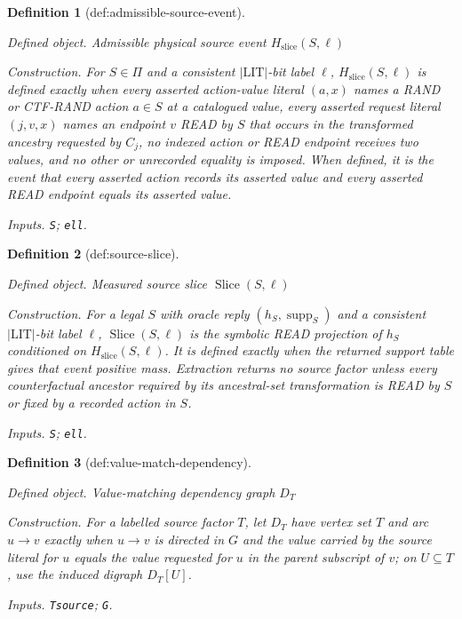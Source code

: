 \documentclass{article}
\newtheorem{definition}{Definition}
\begin{document}
\begin{definition}[def:admissible-source-event]\label{def:admissible-source-event}
\par\smallskip\noindent\emph{Defined object.} Admissible physical source event \(H_{\mathrm{slice}}(S,\ell)\)
\par\smallskip\noindent\emph{Construction.} For \(S\in\Pi\) and a consistent \(|\mathrm{LIT}|\)-bit label \(\ell\), \(H_{\mathrm{slice}}(S,\ell)\) is defined exactly when every asserted action-value literal \((a,x)\) names a RAND or CTF-RAND action \(a\in S\) at a catalogued value, every asserted request literal \((j,v,x)\) names an endpoint \(v\) READ by \(S\) that occurs in the transformed ancestry requested by \(C_j\), no indexed action or READ endpoint receives two values, and no other or unrecorded equality is imposed. When defined, it is the event that every asserted action records its asserted value and every asserted READ endpoint equals its asserted value.
\par\smallskip\noindent\emph{Inputs.} \texttt{S}; \texttt{ell}.
\end{definition}

\begin{definition}[def:source-slice]\label{def:source-slice}
\par\smallskip\noindent\emph{Defined object.} Measured source slice \(\operatorname{Slice}(S,\ell)\)
\par\smallskip\noindent\emph{Construction.} For a legal \(S\) with oracle reply \((h_S,\operatorname{supp}_S)\) and a consistent \(|\mathrm{LIT}|\)-bit label \(\ell\), \(\operatorname{Slice}(S,\ell)\) is the symbolic READ projection of \(h_S\) conditioned on \(H_{\mathrm{slice}}(S,\ell)\). It is defined exactly when the returned support table gives that event positive mass. Extraction returns no source factor unless every counterfactual ancestor required by its ancestral-set transformation is READ by \(S\) or fixed by a recorded action in \(S\).
\par\smallskip\noindent\emph{Inputs.} \texttt{S}; \texttt{ell}.
\end{definition}

\begin{definition}[def:value-match-dependency]\label{def:value-match-dependency}
\par\smallskip\noindent\emph{Defined object.} Value-matching dependency graph \(D_{T}\)
\par\smallskip\noindent\emph{Construction.} For a labelled source factor \(T\), let \(D_T\) have vertex set \(T\) and arc \(u\to v\) exactly when \(u\to v\) is directed in \(G\) and the value carried by the source literal for \(u\) equals the value requested for \(u\) in the parent subscript of \(v\); on \(U\subseteq T\), use the induced digraph \(D_T[U]\).
\par\smallskip\noindent\emph{Inputs.} \texttt{Tsource}; \texttt{G}.
\end{definition}
\end{document}
